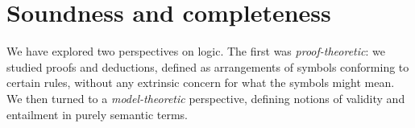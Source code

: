 



\section{Soundness and completeness}\label{sec:prop-completeness}







We have explored two perspectives on logic.
The first was \textit{proof-theoretic}:
we studied proofs and deductions,
defined as arrangements of symbols conforming to certain rules,
without any extrinsic concern for what the symbols might mean.
We then turned to a \textit{model-theoretic} perspective,
defining notions of validity and entailment in purely semantic terms.

